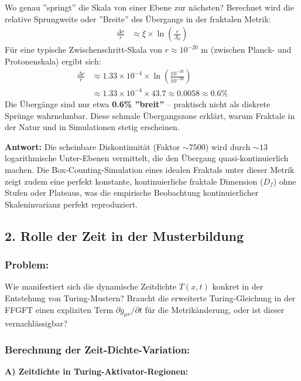 \documentclass[12pt,a4paper]{article}
\begin{document}
	Wo genau ''springt'' die Skala von einer Ebene zur nächsten? Berechnet wird die relative Sprungweite oder ''Breite'' des Übergangs in der fraktalen Metrik:
	\begin{align*}
		\frac{\Delta r}{r} &\approx \xi \times \ln\left(\frac{r}{\Lambda_0}\right)
	\end{align*}
	Für eine typische Zwischenschritt-Skala von $r \approx 10^{-20}$ m (zwischen Planck- und Protonenskala) ergibt sich:
	\begin{align*}
		\frac{\Delta r}{r} &\approx 1.33 \times 10^{-4} \times \ln\left(\frac{10^{-20}}{10^{-39}}\right) \\
		&\approx 1.33 \times 10^{-4} \times 43.7 \approx 0.0058 \approx 0.6\%
	\end{align*}
	Die Übergänge sind nur etwa \textbf{0.6\% ''breit''} – praktisch nicht als diskrete Sprünge wahrnehmbar. Diese schmale Übergangszone erklärt, warum Fraktale in der Natur und in Simulationen stetig erscheinen.
	
	\textbf{Antwort:} Die scheinbare Diskontinuität (Faktor $\sim 7500$) wird durch $\sim 13$ logarithmische Unter-Ebenen vermittelt, die den Übergang quasi-kontinuierlich machen. Die Box-Counting-Simulation eines idealen Fraktals unter dieser Metrik zeigt zudem eine perfekt konstante, kontinuierliche fraktale Dimension ($D_f$) ohne Stufen oder Plateaus, was die empirische Beobachtung kontinuierlicher Skaleninvarianz perfekt reproduziert.
	
	\subsection*{2. Rolle der Zeit in der Musterbildung}
	
	\subsubsection*{Problem:}
	Wie manifestiert sich die dynamische Zeitdichte $T(x,t)$ konkret in der Entstehung von Turing-Mustern? Braucht die erweiterte Turing-Gleichung in der FFGFT einen expliziten Term $\partial g_{\mu\nu}/\partial t$ für die Metrikänderung, oder ist dieser vernachlässigbar?
	
	\subsubsection*{Berechnung der Zeit-Dichte-Variation:}
	
	\textbf{A) Zeitdichte in Turing-Aktivator-Regionen:}
	
\end{document}
